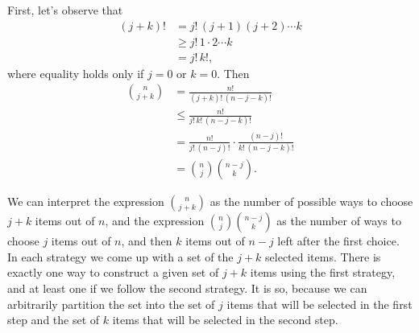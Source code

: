 \starred
First, let's observe that
\begin{align*}
    (j+k)! &= j!\,(j+1)(j+2)\cdots k \\
    &\ge j!\,1\cdot2\cdots k \\
    &= j!\,k!,
\end{align*}
where equality holds only if $j=0$ or $k=0$.
Then
\begin{align*}
    \binom{n}{j+k} &= \frac{n!}{(j+k)!\,(n-j-k)!} \\
    &\le \frac{n!}{j!\,k!\,(n-j-k)!} \\[1mm]
    &= \frac{n!}{j!\,(n-j)!}\cdot\frac{(n-j)!}{k!\,(n-j-k)!} \\[1mm]
    &= \binom{n}{j}\binom{n-j}{k}.
\end{align*}

We can interpret the expression $\binom{n}{j+k}$ as the number of possible ways to choose $j+k$ items out of $n$, and the expression $\binom{n}{j}\binom{n-j}{k}$ as the number of ways to choose $j$ items out of $n$, and then $k$ items out of $n-j$ left after the first choice.
In each strategy we come up with a set of the $j+k$ selected items.
There is exactly one way to construct a given set of $j+k$ items using the first strategy, and at least one if we follow the second strategy.
It is so, because we can arbitrarily partition the set into the set of $j$ items that will be selected in the first step and the set of $k$ items that will be selected in the second step.
